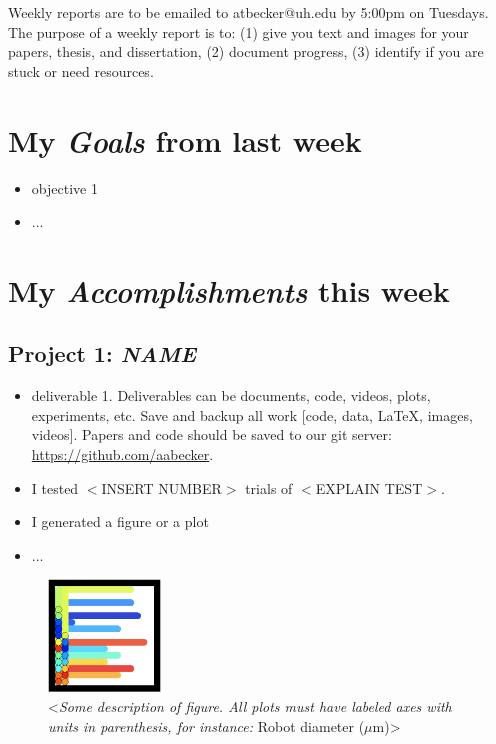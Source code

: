 \newcommand{\handoutName}{Weekly report}
\newcommand{\handoutdate}{\today}
\newcommand{\duedate}{}





{\scriptsize
Weekly reports are to be emailed to atbecker@uh.edu by 5:00pm on Tuesdays.  The purpose of a weekly report is to:
(1) give you text and images for your papers, thesis, and dissertation, (2) document progress, (3) identify if you are stuck or need resources.
}

\section{My \emph{Goals} from last week}
\begin{itemize}
\item objective 1
\item $\ldots$
\end{itemize}


\section{My \emph{Accomplishments} this week}

\subsection{Project 1: \emph{NAME}}

\begin{itemize}
\item deliverable 1.  Deliverables can be documents, code, videos, plots, experiments, etc.	Save and backup all work [code, data, LaTeX, images, videos].  Papers and code should be saved to our git server: \href{github.com/aabecker}{https://github.com/aabecker}.
\item I tested $<$INSERT NUMBER$>$ trials of $<$EXPLAIN TEST$>$.
\item I generated a figure or a plot
\item $\ldots$
\end{itemize}

\begin{figure}[h]
\begin{center}
\includegraphics[width=3cm]{fig/CovergeSimpleEnd.png}
\caption{<\emph{Some description of figure.  All plots must have labeled axes with units in parenthesis, for instance: } Robot diameter ($\mu$m)>}
\end{center}
\end{figure}



